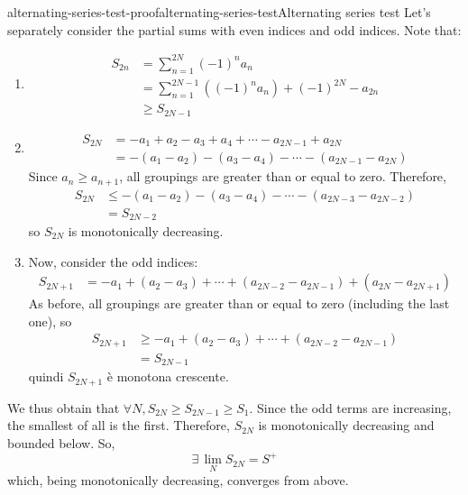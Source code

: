\documentclass[preview]{standalone}
\begin{document}
\begin{snippetproof}{alternating-series-test-proof}{alternating-series-test}{Alternating series test}
    Let's separately consider the partial sums with even indices and odd indices.
    Note that:
    \begin{enumerate}
        \item \begin{align*}
            S_{2n} &= \sum_{n=1}^{2N} {(-1)}^n a_n \\
            &= \sum_{n=1}^{2N-1} \left({(-1)}^n a_n \right) + {(-1)}^{2N} - a_{2n} \\
            &\geq S_{2N-1}
        \end{align*}
        \item \begin{align*}
            S_{2N} &= -a_1 + a_2 -a_3 + a_4 + \cdots - a_{2N-1} + a_{2N} \\
            &= -(a_1 - a_2) -(a_3 - a_4) - \cdots - (a_{2N-1} - a_{2N})
        \end{align*}
        Since \(a_n \geq a_{n+1}\), all groupings are greater than or equal to zero.
        Therefore,
        \begin{align*}
            S_{2N} &\leq -(a_1 - a_2) - (a_3 - a_4) - \cdots - (a_{2N-3} - a_{2N-2}) \\
            &= S_{2N - 2}
        \end{align*}
        so \(S_{2N}\) is monotonically decreasing.
        \item Now, consider the odd indices:
        \begin{align*}
            S_{2N + 1} &= -a_1 + (a_2 - a_3) + \cdots + (a_{2N-2} - a_{2N-1})
            + (a_{2N} - a_{2N+1})
        \end{align*}
        As before, all groupings are greater than or equal to zero (including the last one),
        so
        \begin{align*}
            S_{2N + 1} &\geq -a_1 + (a_2 - a_3) + \cdots + (a_{2N-2} - a_{2N-1}) \\
            &= S_{2N-1}
        \end{align*}
        quindi \(S_{2N+1}\) è monotona crescente.
    \end{enumerate}
    We thus obtain that \(\forall N, S_{2N} \geq S_{2N-1} \geq S_1\). Since the odd terms are increasing, the smallest of all is the first.
    Therefore, \(S_{2N}\) is monotonically decreasing and bounded below.
    So,
    \[
        \exists\, \lim_N S_{2N} = S^+
    \]
    which, being monotonically decreasing, converges from above.

\end{snippetproof}
\end{document}
